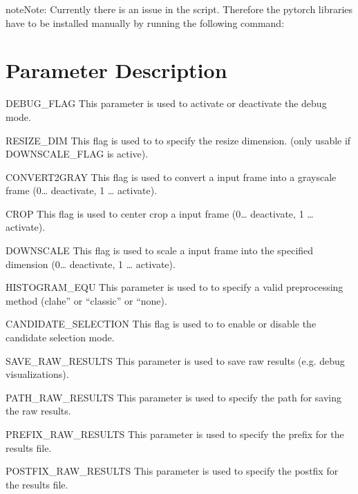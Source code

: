 \documentclass[letterpaper,10pt,english,openany,oneside]{sphinxmanual}
\begin{document}
\begin{sphinxadmonition}{note}{Note:}
Currently there is an issue in the  script. Therefore the pytorch libraries have to be installed manually by running the following command:
\end{sphinxadmonition}


\chapter{Parameter Description}
\label{\detokenize{index:parameter-description}}
DEBUG\_FLAG
This parameter is used to activate or deactivate the debug mode.



RESIZE\_DIM
This flag is used to to specify the resize dimension. (only usable if DOWNSCALE\_FLAG is active).



CONVERT2GRAY
This flag is used to convert a input frame into a grayscale frame (0… deactivate, 1 … activate).



CROP
This flag is used to center crop a input frame (0… deactivate, 1 … activate).



DOWNSCALE
This flag is used to scale a input frame into the specified dimension (0… deactivate, 1 … activate).



HISTOGRAM\_EQU
This parameter is used to to specify a valid pre\sphinxhyphen{}processing method (clahe” or “classic” or “none).



CANDIDATE\_SELECTION
This flag is used to to enable or disable the candidate selection mode.



SAVE\_RAW\_RESULTS
This parameter is used to save raw results (e.g. debug visualizations).



PATH\_RAW\_RESULTS
This parameter is used to specify the path for saving the raw results.



PREFIX\_RAW\_RESULTS
This parameter is used to specify the prefix for the results file.



POSTFIX\_RAW\_RESULTS
This parameter is used to specify the postfix for the results file.
\end{document}
